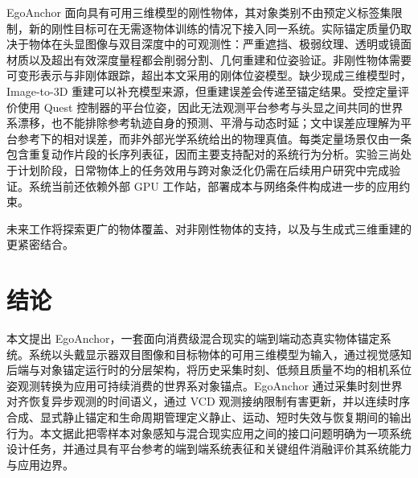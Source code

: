 \documentclass[review]{vgtc}
\begin{document}
EgoAnchor 面向具有可用三维模型的刚性物体，其对象类别不由预定义标签集限制，新的刚性目标可在无需逐物体训练的情况下接入同一系统。实际锚定质量仍取决于物体在头显图像与双目深度中的可观测性：严重遮挡、极弱纹理、透明或镜面材质以及超出有效深度量程都会削弱分割、几何重建和位姿验证。非刚性物体需要可变形表示与非刚体跟踪，超出本文采用的刚体位姿模型。缺少现成三维模型时，Image-to-3D 重建可以补充模型来源，但重建误差会传递至锚定结果。受控定量评价使用 Quest 控制器的平台位姿，因此无法观测平台参考与头显之间共同的世界系漂移，也不能排除参考轨迹自身的预测、平滑与动态时延；文中误差应理解为平台参考下的相对误差，而非外部光学系统给出的物理真值。每类定量场景仅由一条包含重复动作片段的长序列表征，因而主要支持配对的系统行为分析。实验三尚处于计划阶段，日常物体上的任务效用与跨对象泛化仍需在后续用户研究中完成验证。系统当前还依赖外部 GPU 工作站，部署成本与网络条件构成进一步的应用约束。

未来工作将探索更广的物体覆盖、对非刚性物体的支持，以及与生成式三维重建的更紧密结合。

\section{结论}\label{sec:conclusion}

本文提出 EgoAnchor，一套面向消费级混合现实的端到端动态真实物体锚定系统。系统以头戴显示器双目图像和目标物体的可用三维模型为输入，通过视觉感知后端与对象锚定运行时的分层架构，将历史采集时刻、低频且质量不均的相机系位姿观测转换为应用可持续消费的世界系对象锚点。EgoAnchor 通过采集时刻世界对齐恢复异步观测的时间语义，通过 VCD 观测接纳限制有害更新，并以连续时序合成、显式静止锚定和生命周期管理定义静止、运动、短时失效与恢复期间的输出行为。本文据此把零样本对象感知与混合现实应用之间的接口问题明确为一项系统设计任务，并通过具有平台参考的端到端系统表征和关键组件消融评价其系统能力与应用边界。

\clearpage
\raggedbottom



\end{document}
